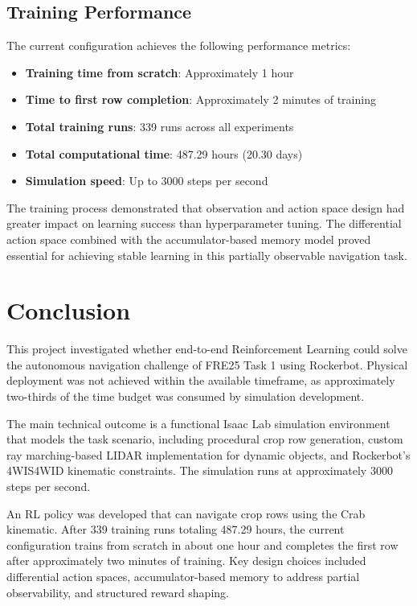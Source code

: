 \documentclass[11pt,a4paper,twocolumn]{article}
\begin{document}
\subsection{Training Performance}
The current configuration achieves the following performance metrics:
\begin{itemize}
    \item \textbf{Training time from scratch}: Approximately 1 hour
    \item \textbf{Time to first row completion}: Approximately 2 minutes of training
    \item \textbf{Total training runs}: 339 runs across all experiments
    \item \textbf{Total computational time}: 487.29 hours (20.30 days)
    \item \textbf{Simulation speed}: Up to 3000 steps per second
\end{itemize}

The training process demonstrated that observation and action space design had greater impact on learning success than hyperparameter tuning. The differential action space combined with the accumulator-based memory model proved essential for achieving stable learning in this partially observable navigation task.

\section{Conclusion}

This project investigated whether end-to-end Reinforcement Learning could solve the autonomous navigation challenge of FRE25 Task 1 using Rockerbot. Physical deployment was not achieved within the available timeframe, as approximately two-thirds of the time budget was consumed by simulation development.

The main technical outcome is a functional Isaac Lab simulation environment that models the task scenario, including procedural crop row generation, custom ray marching-based LIDAR implementation for dynamic objects, and Rockerbot's 4WIS4WID kinematic constraints. The simulation runs at approximately 3000 steps per second.

An RL policy was developed that can navigate crop rows using the Crab kinematic. After 339 training runs totaling 487.29 hours, the current configuration trains from scratch in about one hour and completes the first row after approximately two minutes of training. Key design choices included differential action spaces, accumulator-based memory to address partial observability, and structured reward shaping.
\end{document}
